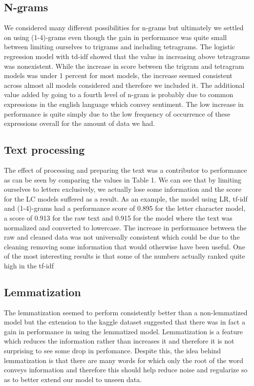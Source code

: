 \documentclass{amsart}
\theoremstyle{definition}
\theoremstyle{remark}
\numberwithin{equation}{section}
\begin{document}
\subsection{N-grams}
We considered many different possibilities for n-grams but ultimately we settled on using (1-4)-grams even though the gain in performance was quite small between limiting ourselves to trigrams and including tetragrams.  The logistic regression model with td-idf showed that the value in increasing above tetragrams was nonexistent.  While the increase in score between the trigram and tetragram models was under 1 percent for most models, the increase seemed consistent across almost all models considered and therefore we included it.  The additional value added by going to a fourth level of n-gram is probably due to common expressions in the english language which convey sentiment.  The low increase in performance is quite simply due to the low frequency of occurrence of these expressions overall for the amount of data we had.
\subsection{Text processing}
The effect of processing and preparing the text was a contributor to performance as can be seen by comparing the values in Table 1.  We can see that by limiting ourselves to letters exclusively, we actually lose some information and the score for the LC models suffered as a result.  As an example, the model using LR, tf-idf and (1-4)-grams had a performance score of 0.895 for the letter character model, a score of 0.913 for the raw text and 0.915 for the model where the text was normalized and converted to lowercase.  The increase in performance between the raw and cleaned data was not universally consistent which could be due to the cleaning removing some information that would otherwise have been useful.  One of the most interesting results is that some of the numbers actually ranked quite high in the tf-idf
\subsection{Lemmatization}
The lemmatization seemed to perform consistently better than a non-lemmatized model but the extension to the kaggle dataset suggested that there was in fact a gain in performance in using the lemmatized model.  Lemmatization is a feature which reduces the information rather than increases it and therefore it is not surprising to see some drop in perfomance.  Despite this, the idea behind lemmatization is that there are many words for which only the root of the word conveys information and therefore this should help reduce noise and regularize so as to better extend our model to unseen data.
\end{document}
